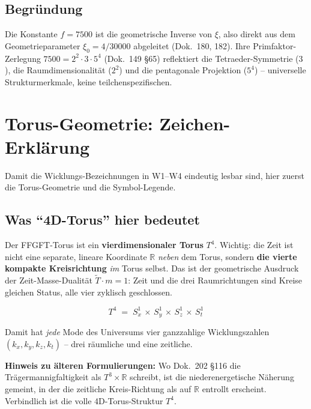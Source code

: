 \subsection*{Begründung}

Die Konstante $f = 7500$ ist die geometrische Inverse von $\xi$,
also direkt aus dem Geometrieparameter $\xi_0 = 4/30000$ abgeleitet
(Dok.~180, 182). Ihre Primfaktor-Zerlegung
$7500 = 2^2 \cdot 3 \cdot 5^4$ (Dok.~149 §65) reflektiert die
Tetraeder-Symmetrie ($3$), die Raumdimensionalität ($2^2$) und die
pentagonale Projektion ($5^4$) -- universelle Strukturmerkmale, keine
teilchenspezifischen.

\section{Torus-Geometrie: Zeichen-Erklärung}

Damit die Wicklungs-Bezeichnungen in W1--W4 eindeutig lesbar sind,
hier zuerst die Torus-Geometrie und die Symbol-Legende.

\subsection*{Was \enquote{4D-Torus} hier bedeutet}

Der FFGFT-Torus ist ein \textbf{vierdimensionaler Torus} $T^4$.
Wichtig: die Zeit ist nicht eine separate, lineare Koordinate
$\mathbb{R}$ \emph{neben} dem Torus, sondern \textbf{die vierte
kompakte Kreisrichtung} \emph{im} Torus selbst. Das ist der
geometrische Ausdruck der Zeit-Masse-Dualität $\tilde T \cdot m = 1$:
Zeit und die drei Raumrichtungen sind Kreise gleichen Status, alle
vier zyklisch geschlossen.

\begin{equation}
  T^4 \;=\; S^1_x \,\times\, S^1_y \,\times\, S^1_z \,\times\, S^1_t
  \tag{210.0}
\end{equation}

Damit hat \emph{jede} Mode des Universums vier ganzzahlige
Wicklungszahlen $(k_x, k_y, k_z, k_t)$ -- drei räumliche und eine
zeitliche.

\textbf{Hinweis zu älteren Formulierungen:} Wo Dok.~202 §116 die
Trägermannigfaltigkeit als $T^3 \times \mathbb{R}$ schreibt, ist
die niederenergetische Näherung gemeint, in der die zeitliche
Kreis-Richtung als auf $\mathbb{R}$ entrollt erscheint. Verbindlich
ist die volle 4D-Torus-Struktur $T^4$.

